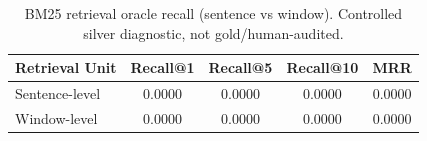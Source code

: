 \begin{table}[ht]
\centering
\caption{BM25 retrieval oracle recall (sentence vs window). Controlled silver diagnostic, not gold/human-audited.}
\label{tab:retrieval_recall}
\begin{tabular}{lcccc}
\toprule
Retrieval Unit & Recall@1 & Recall@5 & Recall@10 & MRR \\
\midrule
Sentence-level & 0.0000 & 0.0000 & 0.0000 & 0.0000 \\
Window-level & 0.0000 & 0.0000 & 0.0000 & 0.0000 \\
\bottomrule
\end{tabular}
\end{table}
